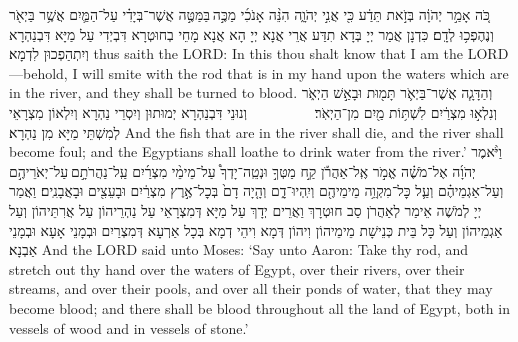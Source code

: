 {%
{כֹּ֚ה אָמַ֣ר יְהֹוָ֔ה בְּזֹ֣את תֵּדַ֔ע כִּ֖י אֲנִ֣י יְהֹוָ֑ה הִנֵּ֨ה אָנֹכִ֜י מַכֶּ֣ה \legarmeh  בַּמַּטֶּ֣ה אֲשֶׁר־בְּיָדִ֗י עַל־הַמַּ֛יִם אֲשֶׁ֥ר בַּיְאֹ֖ר וְנֶהֶפְכ֥וּ לְדָֽם׃
}
{כִּדְנָן אֲמַר יְיָ בְּדָא תִדַּע אֲרֵי אֲנָא יְיָ הָא אֲנָא מָחֵי בְחוּטְרָא דִּבְיְדִי עַל מַיָּא דִּבְנַהְרָא וְיִתְהַפְכוּן לִדְמָא׃}
{thus saith the LORD: In this thou shalt know that I am the LORD—behold, I will smite with the rod that is in my hand upon the waters which are in the river, and they shall be turned to blood.}{}
{וְהַדָּגָ֧ה אֲשֶׁר־בַּיְאֹ֛ר תָּמ֖וּת וּבָאַ֣שׁ הַיְאֹ֑ר וְנִלְא֣וּ מִצְרַ֔יִם לִשְׁתּ֥וֹת מַ֖יִם מִן־הַיְאֹֽר׃ \setuma         
}
{וְנוּנֵי דִּבְנַהְרָא יְמוּתוּן וְיִסְרֵי נַהְרָא וְיִלְאוֹן מִצְרָאֵי לְמִשְׁתֵּי מַיָּא מִן נַהְרָא׃}
{And the fish that are in the river shall die, and the river shall become foul; and the Egyptians shall loathe to drink water from the river.’}{}
{וַיֹּ֨אמֶר יְהֹוָ֜ה אֶל־מֹשֶׁ֗ה אֱמֹ֣ר אֶֽל־אַהֲרֹ֡ן קַ֣ח מַטְּךָ֣ וּנְטֵֽה־יָדְךָ֩ עַל־מֵימֵ֨י מִצְרַ֜יִם עַֽל־נַהֲרֹתָ֣ם \legarmeh  עַל־יְאֹרֵיהֶ֣ם וְעַל־אַגְמֵיהֶ֗ם וְעַ֛ל כׇּל־מִקְוֵ֥ה מֵימֵיהֶ֖ם וְיִֽהְיוּ־דָ֑ם וְהָ֤יָה דָם֙ בְּכׇל־אֶ֣רֶץ מִצְרַ֔יִם וּבָעֵצִ֖ים וּבָאֲבָנִֽים׃
}
{וַאֲמַר יְיָ לְמֹשֶׁה אֵימַר לְאַהֲרֹן סַב חוּטְרָךְ וַאֲרֵים יְדָךְ עַל מַיָּא דְּמִצְרָאֵי עַל נַהְרֵיהוֹן עַל אֲרִתֵּיהוֹן וְעַל אַגְמֵיהוֹן וְעַל כָּל בֵּית כְּנֵישָׁת מֵימֵיהוֹן וִיהוֹן דְּמָא וִיהֵי דְמָא בְּכָל אַרְעָא דְּמִצְרַיִם וּבְמָנֵי אָעָא וּבְמָנֵי אַבְנָא׃}
{And the LORD said unto Moses: ‘Say unto Aaron: Take thy rod, and stretch out thy hand over the waters of Egypt, over their rivers, over their streams, and over their pools, and over all their ponds of water, that they may become blood; and there shall be blood throughout all the land of Egypt, both in vessels of wood and in vessels of stone.’}{}
}
